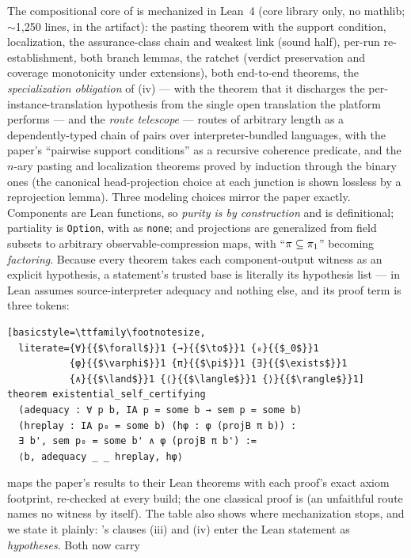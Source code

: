 The compositional core of  is
mechanized in Lean~4 (core library only, no mathlib; $\sim$1,250 lines,
in the artifact): the pasting theorem with the support condition,
localization, the assurance-class chain and weakest link (sound half),
per-run re-establishment, both branch lemmas, the ratchet (verdict
preservation and coverage monotonicity under extensions), both
end-to-end theorems, the \emph{specialization obligation} of
(iv) --- with the theorem that it discharges the
per-instance-translation hypothesis from the single open translation
the platform performs --- and the \emph{route telescope} --- routes of
arbitrary length as a dependently-typed chain of pairs over
interpreter-bundled languages, with the paper's ``pairwise support
conditions'' as a recursive coherence predicate, and the $n$-ary
pasting and localization theorems proved by induction through the
binary ones (the canonical head-projection choice at each junction is
shown lossless by a reprojection lemma). Three modeling
choices mirror the paper exactly. Components are Lean functions, so
\emph{purity is by construction} and  is
definitional; partiality is \texttt{Option}, with \unsupported{} as
\texttt{none}; and projections are generalized from field subsets to
arbitrary observable-compression maps, with ``$\pi \subseteq
\pi_1$'' becoming \emph{factoring}. Because every theorem takes each
component-output witness as an explicit hypothesis, a statement's
trusted base is literally its hypothesis list ---
 in Lean assumes source-interpreter adequacy and
nothing else, and its proof term is three tokens:
\begin{lstlisting}[basicstyle=\ttfamily\footnotesize,
  literate={∀}{{$\forall$}}1 {→}{{$\to$}}1 {₀}{{$_0$}}1
           {φ}{{$\varphi$}}1 {π}{{$\pi$}}1 {∃}{{$\exists$}}1
           {∧}{{$\land$}}1 {⟨}{{$\langle$}}1 {⟩}{{$\rangle$}}1]
theorem existential_self_certifying
  (adequacy : ∀ p b, IA p = some b → sem p = some b)
  (hreplay : IA p₀ = some b) (hφ : φ (projB π b)) :
  ∃ b', sem p₀ = some b' ∧ φ (projB π b') :=
  ⟨b, adequacy _ _ hreplay, hφ⟩
\end{lstlisting}
 maps the paper's results to their Lean theorems with
each proof's exact axiom footprint, re-checked at every build; the one
classical proof is  (an unfaithful route names
no witness by itself). The table also shows where mechanization stops,
and we state it plainly: 's clauses (iii) and (iv)
enter the Lean statement as \emph{hypotheses}. Both now carry
